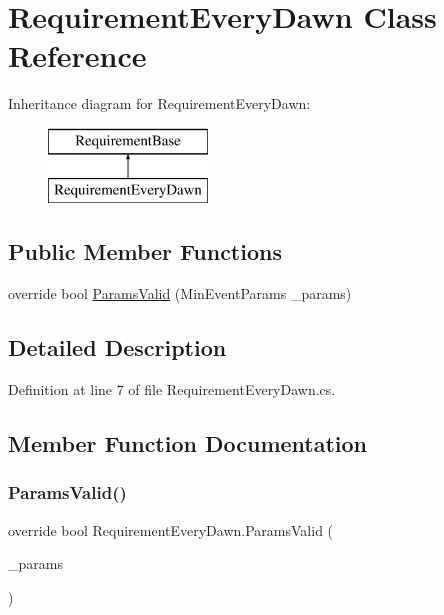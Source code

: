 \hypertarget{class_requirement_every_dawn}{}\section{Requirement\+Every\+Dawn Class Reference}
\label{class_requirement_every_dawn}
Inheritance diagram for Requirement\+Every\+Dawn\+:\begin{figure}[H]
\begin{center}
\leavevmode
\includegraphics[height=2.000000cm]{class_requirement_every_dawn}
\end{center}
\end{figure}
\subsection*{Public Member Functions}
\begin{DoxyCompactItemize}
\item 
override bool \mbox{\hyperlink{class_requirement_every_dawn_ac497f086fcc85d450bf5c8d02b511eb3}{Params\+Valid}} (Min\+Event\+Params \+\_\+params)
\end{DoxyCompactItemize}


\subsection{Detailed Description}


Definition at line 7 of file Requirement\+Every\+Dawn.\+cs.



\subsection{Member Function Documentation}
\mbox{\label{class_requirement_every_dawn_ac497f086fcc85d450bf5c8d02b511eb3}} 
\subsubsection{\texorpdfstring{ParamsValid()}{ParamsValid()}}
{\footnotesize\ttfamily override bool Requirement\+Every\+Dawn.\+Params\+Valid (\begin{DoxyParamCaption}\item[{Min\+Event\+Params}]{\+\_\+params }\end{DoxyParamCaption})}



